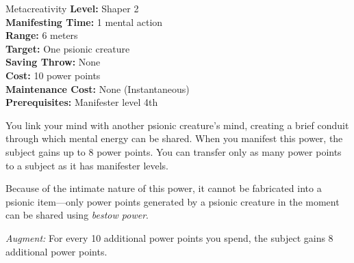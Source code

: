 {Metacreativity}
{
	\textbf{Level:}
	Shaper 2\\
	\textbf{Manifesting Time:}
	1 mental action\\
	\textbf{Range:}
	6 meters\\
	\textbf{Target:}
	One psionic creature\\
	\textbf{Saving Throw:}
	None\\
	\textbf{Cost:}
	10 power points\\
	\textbf{Maintenance Cost:}
	None (Instantaneous)\\
	\textbf{Prerequisites:}
	Manifester level 4th\\
}
{
	You link your mind with another psionic creature's mind, creating a brief conduit through which mental energy can be shared. When you manifest this power, the subject gains up to 8 power points. You can transfer only as many power points to a subject as it has manifester levels.

	Because of the intimate nature of this power, it cannot be fabricated into a psionic item---only power points generated by a psionic creature in the moment can be shared using \emph{bestow power}.

	\textit{Augment:} For every 10 additional power points you spend, the subject gains 8 additional power points.
}